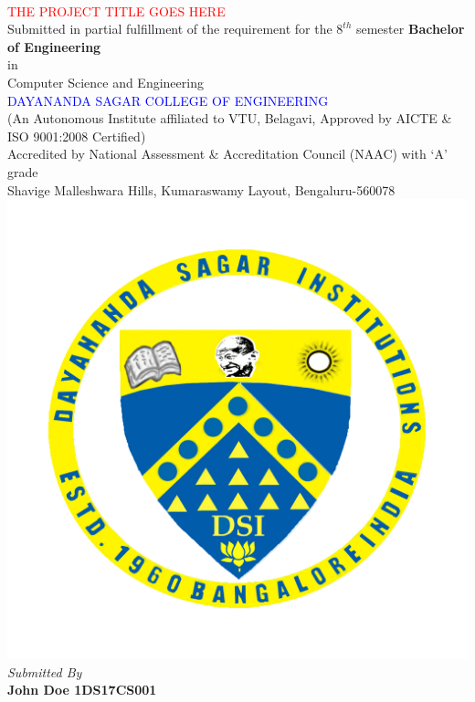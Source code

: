 \documentclass[ 12pt,a4paper,twocolumn,fleqn]{article}
\begin{document}
\chead{}
\onecolumn
\begin{center}
 \\
\smallskip
\textcolor{red}{\LARGE{THE PROJECT TITLE GOES HERE}} \\
\large{Submitted in partial fulfillment of the requirement for the $8^{th}$ semester}
\large{\textbf{Bachelor of Engineering}} \\
\large{in} \\
\large{Computer Science and Engineering} \\
\textcolor{blue}{\LARGE{DAYANANDA SAGAR COLLEGE OF ENGINEERING}} \\
\footnotesize{(An Autonomous Institute affiliated to VTU, Belagavi, Approved by AICTE \& ISO 9001:2008 Certified)} \\
\footnotesize{Accredited by National Assessment \& Accreditation Council (NAAC) with ‘A’ grade}  \\
\footnotesize{Shavige Malleshwara Hills, Kumaraswamy Layout, Bengaluru-560078} \\
\includegraphics[scale=0.4]{media/DSCE-min.png} \\
\textit{Submitted By} \\
\textbf{John Doe \space 1DS17CS001} \\

\end{center}
\end{document}
